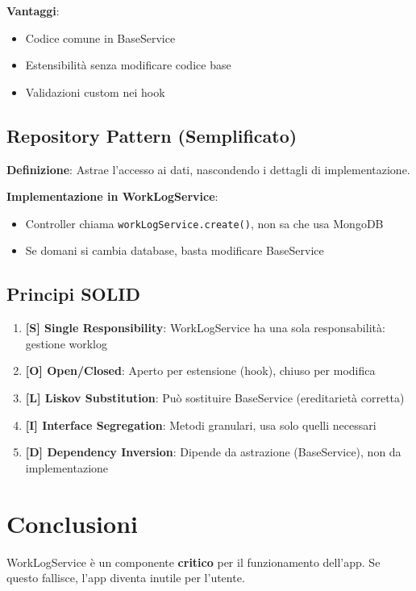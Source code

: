 \documentclass[11pt,a4paper]{article}
\begin{document}
\textbf{Vantaggi}:
\begin{itemize}
    \item Codice comune in BaseService
    \item Estensibilità senza modificare codice base
    \item Validazioni custom nei hook
\end{itemize}

\subsection{Repository Pattern (Semplificato)}

\textbf{Definizione}: Astrae l'accesso ai dati, nascondendo i dettagli di implementazione.

\textbf{Implementazione in WorkLogService}:
\begin{itemize}
    \item Controller chiama \texttt{workLogService.create()}, non sa che usa MongoDB
    \item Se domani si cambia database, basta modificare BaseService
\end{itemize}

\subsection{Principi SOLID}

\begin{enumerate}
    \item \textbf{[S] Single Responsibility}: WorkLogService ha una sola responsabilità: gestione worklog
    \item \textbf{[O] Open/Closed}: Aperto per estensione (hook), chiuso per modifica
    \item \textbf{[L] Liskov Substitution}: Può sostituire BaseService (ereditarietà corretta)
    \item \textbf{[I] Interface Segregation}: Metodi granulari, usa solo quelli necessari
    \item \textbf{[D] Dependency Inversion}: Dipende da astrazione (BaseService), non da implementazione
\end{enumerate}

\section{Conclusioni}

WorkLogService è un componente \textbf{critico} per il funzionamento dell'app. Se questo fallisce, l'app diventa inutile per l'utente.
\end{document}
